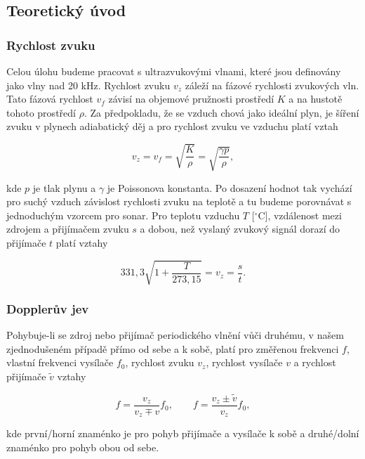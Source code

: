 \documentclass[english]{article}
\begin{document}
\subsection{Teoretický úvod}

	\subsubsection{Rychlost zvuku}
		Celou úlohu budeme pracovat s ultrazvukovými vlnami, které jsou definovány jako vlny nad 20 kHz. Rychlost zvuku $v_z$ záleží na fázové rychlosti zvukových vln. Tato fázová rychlost $v_f$ závisí na objemové pružnosti prostředí $K$ a na hustotě tohoto prostředí $\rho$. Za předpokladu, že se vzduch chová jako ideální plyn, je šíření zvuku v plynech adiabatický děj a pro rychlost zvuku ve vzduchu platí vztah
		
		\begin{equation}
			v_z = v_f = \sqrt{\frac{K}{\rho}} = \sqrt{\frac{\gamma p}{\rho}},
			\label{eq:teorie_pomocna_1}
		\end{equation}
	
	    kde $p$ je tlak plynu a $\gamma$ je Poissonova konstanta. Po dosazení hodnot tak vychází pro suchý vzduch závislost rychlosti zvuku na teplotě a tu budeme porovnávat s jednoduchým vzorcem pro sonar. Pro teplotu vzduchu $T$ [$^\circ $C], vzdálenost mezi zdrojem a přijímačem zvuku $s$ a dobou, než vyslaný zvukový signál dorazí do přijímače $t$ platí vztahy
	      
	    \begin{equation}
	    	331,3 \sqrt{1+\frac{T}{273,15}} = v_z =\frac{s}{t}.
	    	\label{eq:teorie_rychlost_zvuku}
	    \end{equation}
	    
    \subsubsection{Dopplerův jev}
		Pohybuje-li se zdroj nebo přijímač periodického vlnění vůči druhému, v našem zjednodušeném případě přímo od sebe a k sobě, platí pro změřenou frekvenci $f$, vlastní frekvenci vysílače $f_0$, rychlost zvuku $v_z$, rychlost vysílače $v$ a rychlost přijímače $\tilde{v}$ vztahy
		
		\begin{equation}
	    	f = \frac{v_z}{v_z \mp v} f_0, \qquad f = \frac{v_z \pm \tilde{v}}{v_z} f_0,
	    	\label{eq:teorie_doppler}
		\end{equation}
		
		kde první/horní znaménko je pro pohyb přijímače a vysílače k sobě a druhé/dolní znaménko pro pohyb obou od sebe.
	
\end{document}
